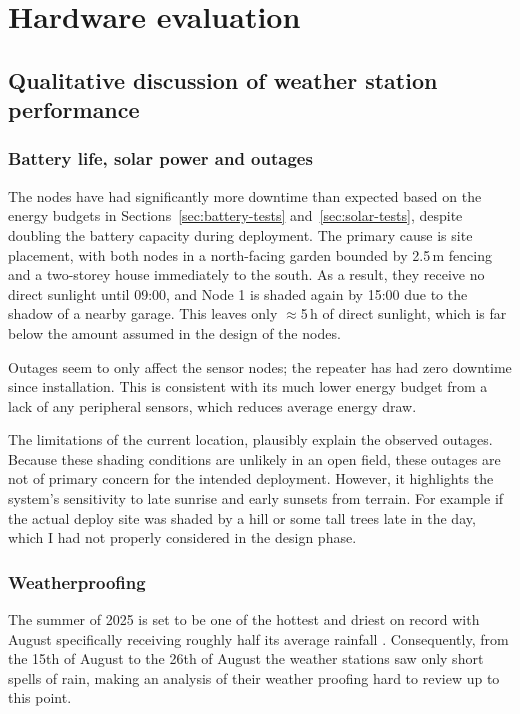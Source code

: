 \section{Hardware evaluation}\label{hardware-evaluation}

\subsection{Qualitative discussion of weather station performance}

\subsubsection{Battery life, solar power and
outages}\label{sec:hardware-evaluation-power}

The nodes have had significantly more downtime than expected based on the energy
budgets in Sections~\ref{sec:battery-tests} and~\ref{sec:solar-tests}, despite
doubling the battery capacity during deployment. The primary cause is site
placement, with both nodes in a north-facing garden bounded by 2.5\,m fencing
and a two-storey house immediately to the south. As a result, they receive no
direct sunlight until 09:00, and Node 1 is shaded again by 15:00 due to the
shadow of a nearby garage. This leaves only \(\approx\)5\,h of direct sunlight,
which is far below the amount assumed in the design of the nodes.

Outages seem to only affect the sensor nodes; the repeater has had zero downtime
since installation. This is consistent with its much lower energy budget from a
lack of any peripheral sensors, which reduces average energy draw.

The limitations of the current location, plausibly explain the observed outages.
Because these shading conditions are unlikely in an open field, these outages
are not of primary concern for the intended deployment. However, it highlights
the system's sensitivity to late sunrise and early sunsets from terrain. For
example if the actual deploy site was shaded by a hill or some tall trees late
in the day, which I had not properly considered in the design phase.

\subsubsection{Weatherproofing}

The summer of 2025 is set to be one of the hottest and driest on record with
August specifically receiving roughly half its average rainfall
\cite{uor2025summer}. Consequently, from the 15th of August to the 26th of
August the weather stations saw only short spells of rain, making an analysis of
their weather proofing hard to review up to this point. 

